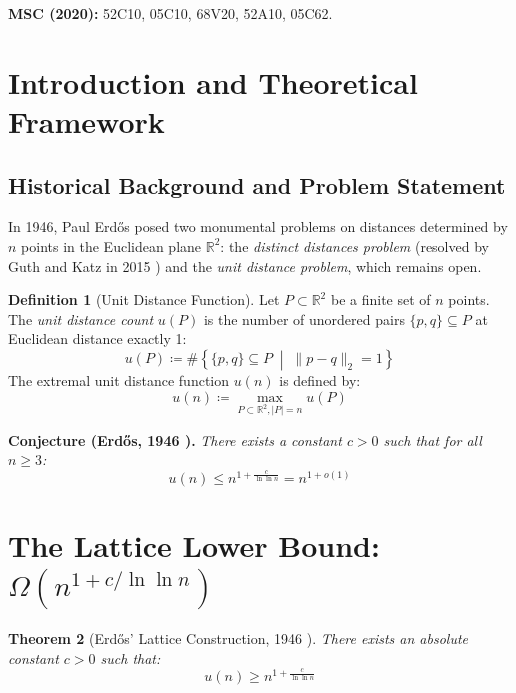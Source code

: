 \documentclass[11pt,a4paper]{article}
\newtheorem{theorem}{Theorem}[section]
\theoremstyle{definition}
\newtheorem{definition}[theorem]{Definition}
\begin{document}
\noindent\textbf{MSC (2020):} 52C10, 05C10, 68V20, 52A10, 05C62.

\tableofcontents
\newpage

\section{Introduction and Theoretical Framework}

\subsection{Historical Background and Problem Statement}
In 1946, Paul Erd\H{o}s \cite{erdos1946distances} posed two monumental problems on distances determined by $n$ points in the Euclidean plane $\mathbb{R}^2$: the \emph{distinct distances problem} (resolved by Guth and Katz in 2015 \cite{guth2015}) and the \emph{unit distance problem}, which remains open.

\begin{definition}[Unit Distance Function]\label{def:unit_dist}
Let $P \subset \mathbb{R}^2$ be a finite set of $n$ points.
The \emph{unit distance count} $u(P)$ is the number of unordered pairs $\{p, q\} \subseteq P$ at Euclidean distance exactly 1:
\begin{equation}\label{eq:unit_pairs}
u(P) \coloneqq \#\left\{ \{p, q\} \subseteq P \;\middle|\; \|p - q\|_2 = 1 \right\}
\end{equation}
The extremal unit distance function $u(n)$ is defined by:
\begin{equation}\label{eq:ext_unit}
u(n) \coloneqq \max_{P \subset \mathbb{R}^2, |P| = n} u(P)
\end{equation}
\end{definition}

\noindent\textbf{Conjecture (Erd\H{o}s, 1946 \cite{erdos1946distances}).} \textit{There exists a constant $c > 0$ such that for all $n \ge 3$:}
\begin{equation}\label{eq:erdos_unit_conj}
u(n) \le n^{1 + \frac{c}{\ln \ln n}} = n^{1 + o(1)}
\end{equation}

\section{The Lattice Lower Bound: $\Omega(n^{1 + c/\ln \ln n})$}

\begin{theorem}[Erd\H{o}s' Lattice Construction, 1946 \cite{erdos1946distances}]\label{thm:lattice_lower}
There exists an absolute constant $c > 0$ such that:
\begin{equation}\label{eq:lattice_bound}
u(n) \ge n^{1 + \frac{c}{\ln \ln n}}
\end{equation}
\end{theorem}
\end{document}
